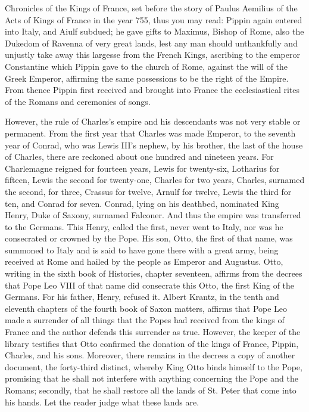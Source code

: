 Chronicles of the Kings of France, set before the story of Paulus Aemilius of the Acts of Kings of France in the year 755, thus you may read: Pippin again entered into Italy, and Aiulf subdued; he gave gifts to Maximus, Bishop of Rome, also the Dukedom of Ravenna of very great lands, lest any man should unthankfully and unjustly take away this largesse from the French Kings, ascribing to the emperor Constantine which Pippin gave to the church of Rome, against the will of the Greek Emperor, affirming the same possessions to be the right of the Empire. From thence Pippin first received and brought into France the ecclesiastical rites of the Romans and ceremonies of songs.

However, the rule of Charles’s empire and his descendants was not very stable or permanent. From the first year that Charles was made Emperor, to the seventh year of Conrad, who was Lewis III’s nephew, by his brother, the last of the house of Charles, there are reckoned about one hundred and nineteen years. For Charlemagne reigned for fourteen years, Lewis for twenty-six, Lotharius for fifteen, Lewis the second for twenty-one, Charles for two years, Charles, surnamed the second, for three, Crassus for twelve, Arnulf for twelve, Lewis the third for ten, and Conrad for seven. Conrad, lying on his deathbed, nominated King Henry, Duke of Saxony, surnamed Falconer. And thus the empire was transferred to the Germans. This Henry, called the first, never went to Italy, nor was he consecrated or crowned by the Pope. His son, Otto, the first of that name, was summoned to Italy and is said to have gone there with a great army, being received at Rome and hailed by the people as Emperor and Augustus. Otto, writing in the sixth book of Histories, chapter seventeen, affirms from the decrees that Pope Leo VIII of that name did consecrate this Otto, the first King of the Germans. For his father, Henry, refused it. Albert Krantz, in the tenth and eleventh chapters of the fourth book of Saxon matters, affirms that Pope Leo made a surrender of all things that the Popes had received from the kings of France and the author defends this surrender as true. However, the keeper of the library testifies that Otto confirmed the donation of the kings of France, Pippin, Charles, and his sons. Moreover, there remains in the decrees a copy of another document, the forty-third distinct, whereby King Otto binds himself to the Pope, promising that he shall not interfere with anything concerning the Pope and the Romans; secondly, that he shall restore all the lands of St. Peter that come into his hands. Let the reader judge what these lands are.

